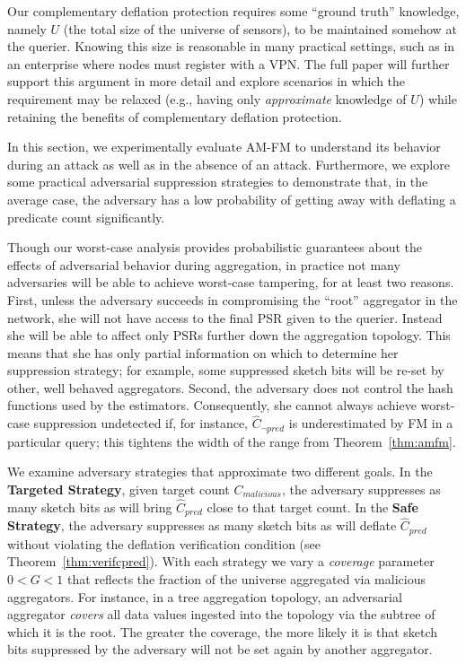 \documentclass[10pt,twocolumn]{article}
\newcommand{\amfm}{AM-FM\xspace}
\newcommand{\estcpred}{\ensuremath{\hat{C}_\mathit{pred}}\xspace}
\newcommand{\estcnpred}{\ensuremath{\hat{C}_{\neg\mathit{pred}}}\xspace}
\newcommand{\cmalicious}{\ensuremath{{C}_\mathit{malicious}}\xspace}
\newcommand\vpar{{\vspace*{0.3em}}}
\newcommand{\stitle}[1]{\vpar\noindent{\bf #1\/}}
\begin{document}
\stitle{Universal Population Knowledge.}
Our complementary deflation protection requires some 
``ground truth'' knowledge, namely $U$ (the total size
of the universe of sensors), to be maintained somehow at the 
querier. 
Knowing this size is 
reasonable in many practical settings, such as in an enterprise
where nodes must register with a VPN. The full paper will further
support
this argument in more detail and explore scenarios 
in which the requirement may be relaxed (e.g., having only 
{\em approximate\/} knowledge of $U$) while retaining the 
benefits of complementary deflation protection.



\label{sec:experiments}
\vspace{-1em}
In this section, we experimentally evaluate \amfm to understand its
behavior during an attack as well as in the absence of an attack.  Furthermore, we
explore some practical adversarial suppression strategies to demonstrate
that,  in the average case, the adversary has a
low probability of getting away with deflating a predicate count
significantly.


\vspace{-1em}
Though our worst-case analysis provides
probabilistic guarantees about
the effects of adversarial behavior during aggregation, in practice not
many adversaries will be able to achieve worst-case tampering, for at
least two reasons.  First, unless the adversary succeeds in
compromising the ``root'' aggregator in the network, she will not have access
to the final PSR given to the querier.  Instead she will be able to affect only PSRs
further down the aggregation topology. This means
that she has only partial information on which to determine her
suppression strategy;  for example, some suppressed sketch bits
will be re-set by other, well behaved
aggregators.  Second, the adversary does not control the hash functions
used by the estimators.  Consequently, she cannot always achieve
worst-case suppression undetected if, for instance, \estcnpred is
underestimated by FM in a particular query; this tightens the width
of the range from Theorem~\ref{thm:amfm}.

We examine adversary strategies that approximate two different
goals.  In the {\bf Targeted Strategy},  given target count
\cmalicious, the adversary 
  suppresses as many sketch bits as will bring \estcpred close to that
  target count.  In the {\bf Safe Strategy}, the adversary  suppresses as many sketch bits as will deflate \estcpred
  without violating the deflation verification condition (see
  Theorem~\ref{thm:verifcpred}).
With each strategy we vary a \emph{coverage} parameter $0<G < 1$ that
reflects the fraction  of the universe aggregated via malicious aggregators. For
instance, in a tree aggregation topology, an adversarial aggregator
\emph{covers} all data values ingested into the topology via the subtree
of which it is the root.  The greater the coverage, the more
likely it is that sketch bits suppressed by the adversary will not be
set again by another aggregator.
\end{document}
